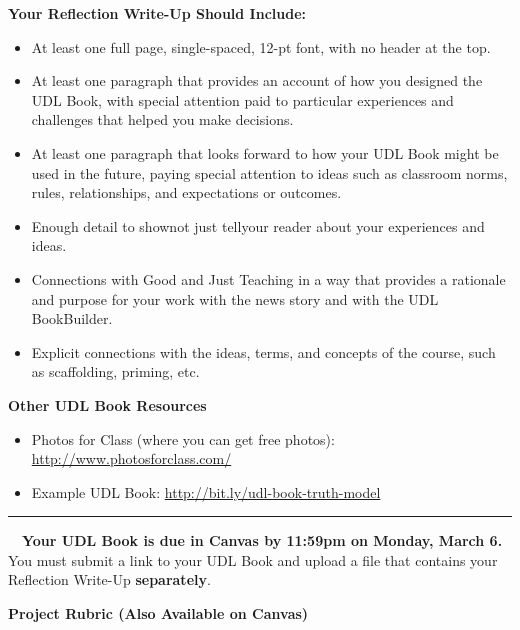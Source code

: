 \documentclass[10pt]{article}
\newcommand{\dueDate}[1]{\textbf{\textcolor{fsuMaroon}{#1}}}
\newcommand{\subHead}[1]{\noindent\textbf{\textsf{\textcolor{fsuMaroon}{#1}}}}
\newcommand{\dueCalendar}{\noindent\lettrine{\dueDate{\faCalendar}}{~~}}
\newcommand{\dueText}[1]{\normalsize\textsf{#1}}
\newcommand{\bottomRule}{\vfill\begin{center}\rule{4in}{1pt}\end{center}}
\begin{document}
\subHead{Your Reflection Write-Up Should Include:}
\begin{itemize}
	\itemsep-0.5em
	\item At least one full page, single-spaced, 12-pt font, with no header at the top.
	\item At least one paragraph that provides an account of how you designed the UDL Book, with special attention paid to particular experiences and challenges that helped you make decisions.
	\item At least one paragraph that looks forward to how your UDL Book might be used in the future, paying special attention to ideas such as classroom norms, rules, relationships, and expectations or outcomes.
	\item Enough detail to show{\textemdash}not just tell{\textemdash}your reader about your experiences and ideas.
	\item Connections with Good and Just Teaching in a way that provides a rationale and purpose for your work with the news story and with the UDL BookBuilder.
	\item Explicit connections with the ideas, terms, and concepts of the course, such as scaffolding, priming, etc.
\end{itemize}

\subHead{Other UDL Book Resources}
\begin{itemize}
	\itemsep-0.5em
	\item Photos for Class (where you can get free photos): \url{http://www.photosforclass.com/}
	\item Example UDL Book: \url{http://bit.ly/udl-book-truth-model}
\end{itemize}

\bottomRule

\dueCalendar\dueText{\dueDate{Your UDL Book is due in Canvas by 11:59pm on Monday, March 6.}} You must submit a link to your UDL Book and upload a file that contains your Reflection Write-Up \textbf{separately}.
\newpage

\subHead{Project Rubric (Also Available on Canvas)}

\footnotesize
\end{document}

